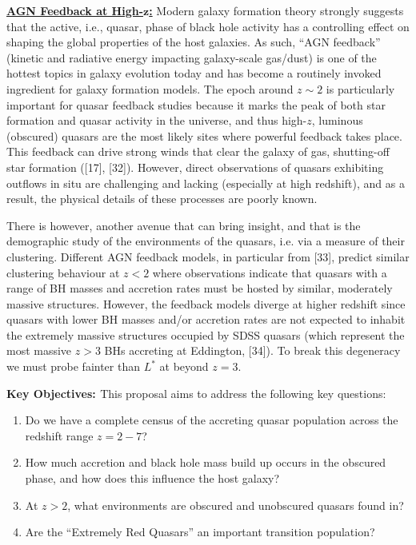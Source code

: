 \documentclass[oneside, a4paper, onecolumn, 11pt]{article}
\begin{document}
\smallskip
\smallskip
\noindent
{\bf \underline {AGN Feedback at High-$\pmb{z}$:}}
Modern galaxy formation theory strongly suggests that the active,
i.e., quasar, phase of black hole activity has a controlling effect on
shaping the global properties of the host galaxies. As such, ``AGN
feedback'' (kinetic and radiative energy impacting galaxy-scale
gas/dust) is one of the hottest topics in galaxy evolution today and
has become a routinely invoked ingredient for galaxy formation models.
The epoch around $z\sim2$ is particularly important for quasar
feedback studies because it marks the peak of both star formation and
quasar activity in the universe, and thus high-$z$, luminous
(obscured) quasars are the most likely sites where powerful feedback
takes place. This feedback can drive strong winds that clear the
galaxy of gas, shutting-off star formation ([17], [32]). 
However, direct observations of quasars exhibiting outflows in situ 
are challenging and lacking (especially at high redshift), and as a result, 
the physical details of these processes are poorly known.

\smallskip
\smallskip
\noindent
There is however, another avenue that can bring insight, and that is
the demographic study of the environments of the quasars, i.e. via a
measure of their clustering. Different AGN feedback models, in
particular from [33], predict similar clustering behaviour at $z < 2$ where
observations indicate that quasars with a range of BH masses and
accretion rates must be hosted by similar, moderately massive
structures. However, the feedback models diverge at higher redshift
since quasars with lower BH masses and/or accretion rates are not
expected to inhabit the extremely massive structures occupied by SDSS
quasars (which represent the most massive $z > 3$ BHs accreting at
Eddington, [34]). To break this degeneracy we must probe fainter than $L^{*}$ 
at beyond $z=3$.


\smallskip
\smallskip
\noindent
{\bf  {\large Key Objectives: }}
This proposal aims to address the following key questions:
\begin{enumerate}
    \item{Do we have a complete census of the accreting quasar population across the redshift range  $z=2-7$? }
    \item{How much accretion and black hole mass build up occurs in the obscured phase, and how does this influence 
    the host galaxy?}
    \item{At $z>2$, what environments are obscured and unobscured quasars found in?}
    \item{Are the ``Extremely Red Quasars'' an important transition population?}
\end{enumerate}
\end{document}
